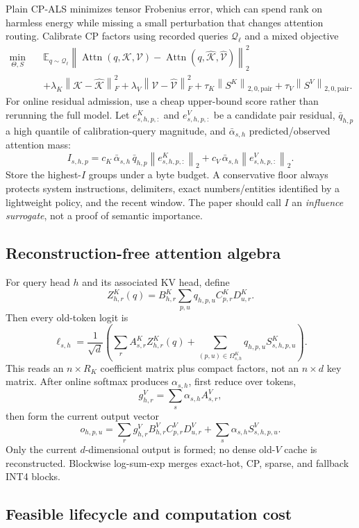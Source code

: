 \documentclass[10pt]{article}
\newcommand{\E}{\mathbb{E}}
\newcommand{\norm}[1]{\left\lVert #1\right\rVert}
\newcommand{\Attn}{\operatorname{Attn}}
\begin{document}
Plain CP-ALS minimizes tensor Frobenius error, which can spend rank on harmless energy while
missing a small perturbation that changes attention routing. Calibrate CP factors using recorded
queries $\mathcal Q_\ell$ and a mixed objective
\[
\begin{split}
\min_{\Theta,S}\quad
&\E_{q\sim\mathcal Q_\ell}
 \norm{\Attn(q,\mathcal K,\mathcal V)
 -\Attn(q,\widehat{\mathcal K},\widehat{\mathcal V})}_2^2\\
&+\lambda_K\norm{\mathcal K-\widehat{\mathcal K}}_F^2
 +\lambda_V\norm{\mathcal V-\widehat{\mathcal V}}_F^2
 +\tau_K\norm{S^K}_{2,0,\mathrm{pair}}
 +\tau_V\norm{S^V}_{2,0,\mathrm{pair}} .
\end{split}
\]
For online residual admission, use a cheap upper-bound score rather than rerunning the full model.
Let $e^K_{s,h,p,:}$ and $e^V_{s,h,p,:}$ be a candidate pair residual, $\bar q_{h,p}$ a high
quantile of calibration-query magnitude, and $\bar\alpha_{s,h}$ predicted/observed attention mass:
\[
 I_{s,h,p} =
 c_K\,\bar\alpha_{s,h}\,\bar q_{h,p}\norm{e^K_{s,h,p,:}}_2
 +c_V\,\bar\alpha_{s,h}\norm{e^V_{s,h,p,:}}_2 .
\]
Store the highest-$I$ groups under a byte budget. A conservative floor always protects system
instructions, delimiters, exact numbers/entities identified by a lightweight policy, and the
recent window. The paper should call $I$ an \emph{influence surrogate}, not a proof of semantic
importance.

\subsection{Reconstruction-free attention algebra}

For query head $h$ and its associated KV head, define
\[
 Z^K_{h,r}(q)=B^K_{h,r}\sum_{p,u}q_{h,p,u}C^K_{p,r}D^K_{u,r}.
\]
Then every old-token logit is
\[
 \ell_{s,h}=\frac{1}{\sqrt d}\left(
\sum_r A^K_{s,r}Z^K_{h,r}(q)
+ \sum_{(p,u)\in\Omega^K_{s,h}}q_{h,p,u}S^K_{s,h,p,u}
\right).
\]
This reads an $n\times R_K$ coefficient matrix plus compact factors, not an $n\times d$ key
matrix. After online softmax produces $\alpha_{s,h}$, first reduce over tokens,
\[
 g^V_{h,r}=\sum_s\alpha_{s,h}A^V_{s,r},
\]
then form the current output vector
\[
 o_{h,p,u}=\sum_r g^V_{h,r}B^V_{h,r}C^V_{p,r}D^V_{u,r}
+\sum_s\alpha_{s,h}S^V_{s,h,p,u}.
\]
Only the current $d$-dimensional output is formed; no dense old-$V$ cache is reconstructed.
Blockwise log-sum-exp merges exact-hot, CP, sparse, and fallback INT4 blocks.

\subsection{Feasible lifecycle and computation cost}
\end{document}
